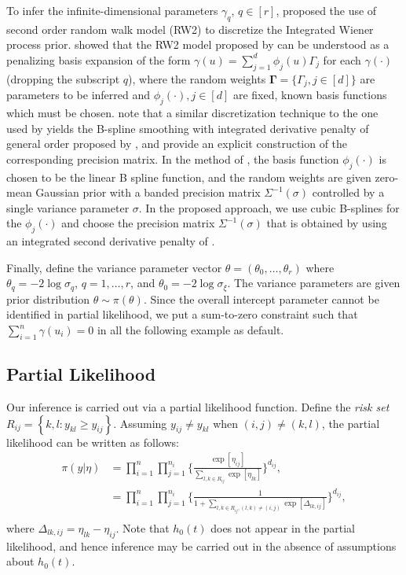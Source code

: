 \documentclass[ba]{imsart}
\begin{document}
To infer the infinite-dimensional parameters $\gamma_q$, $q \in [r]$, \cite{rw2} proposed the use of second order random walk model (RW2) to discretize the Integrated Wiener process prior. \cite{SPDEandPspline} showed that the RW2 model proposed by \cite{rw2} can be understood as a penalizing basis expansion of the form $\gamma(u) = \sum_{j=1}^{d}\phi_{j}(u)\Gamma_{j}$ for each $\gamma(\cdot)$ (dropping the subscript $q$), where the random weights $\boldsymbol{\Gamma} = \{\Gamma_{j},j\in[d]\}$ are parameters to be inferred and $\phi_{j}(\cdot),j\in[d]$ are fixed, known basis functions which must be chosen. 
\cite{adaptivesmoothingsplines} note that a similar discretization technique to the one used by \cite{rw2} yields the B-spline smoothing with integrated derivative penalty of general order proposed by \cite{osullivanspline}, and \cite{derivativepenalties} provide an explicit construction of the corresponding precision matrix.
In the method of \cite{rw2}, the basis function $\phi_{j}(\cdot)$ is chosen to be the linear B spline function, and the random weights are given zero-mean Gaussian prior with a banded precision matrix $\Sigma^{-1}(\sigma)$ controlled by a single variance parameter $\sigma$.
In the proposed approach, we use cubic B-splines for the $\phi_{j}(\cdot)$ and choose the precision matrix $\Sigma^{-1}(\sigma)$ that is obtained by using an integrated second derivative penalty of \cite{derivativepenalties}.

Finally, define the variance parameter vector $\theta = (\theta_{0},\ldots,\theta_{r})$ where $\theta_{q} = -2\log\sigma_{q}$, $q = 1,\ldots,r$, and $\theta_{0} = -2\log\sigma_{\xi}$. The variance parameters are given prior distribution $\theta \sim \pi(\theta)$. Since the overall intercept parameter cannot be identified in partial likelihood, we put a sum-to-zero constraint such that $\sum_{i=1}^{n} \gamma{(u_i)} = 0$ in all the following example as default.



\subsection{Partial Likelihood}

Our inference is carried out via a partial likelihood function. Define the \textit{risk set} $R_{ij} = \left\{k,l : y_{kl} \geq y_{ij}\right\}$. Assuming $y_{ij} \neq y_{kl}$ when $(i,j) \neq (k,l)$, the partial likelihood can be written as follows: 
\begin{equation}\begin{aligned}\label{eqn:partial}
\pi(y|\eta) &= \prod_{i=1}^{n}\prod_{j=1}^{n_{i}} \bigg\{\frac{\exp[\eta_{ij}]}{{\sum_{l,k\in R_{ij}}^{}\exp[\eta_{lk}]}}\bigg \}^{d_{ij}} , \\
&= \prod_{i=1}^{n}\prod_{j=1}^{n_{i}} \bigg\{\frac{1}{{1 + \sum_{l,k\in R_{ij} , (l,k) \neq (i,j)}\exp[\Delta_{lk,ij}]}}\bigg \}^{d_{ij}} , \\
\end{aligned}\end{equation}
where $\Delta_{lk,ij} = \eta_{lk} - \eta_{ij}$. Note that $h_{0}(t)$ does not appear in the partial likelihood, and hence inference may be carried out in the absence of assumptions about $h_{0}(t)$. 
\end{document}
